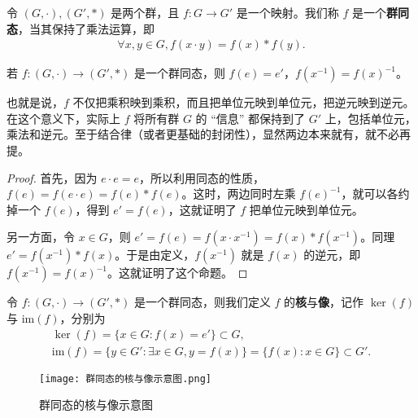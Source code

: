 \documentclass[../../main.tex]{subfiles}
\begin{document}
\begin{definition}[群同态]
令 $(G, \cdot), (G', *)$ 是两个群，且 $f : G \to G'$ 是一个映射。我们称 $f$ 是一个\textbf{群同态}，当其保持了乘法运算，即
\begin{align*}
\forall x, y \in G, f(x \cdot y) = f(x) * f(y).
\end{align*} 
\end{definition}

\begin{proposition}\label{proposition:群同态保持逆元和单位元}
若 $f : (G, \cdot) \to (G', *)$ 是一个群同态，则 $f(e) = e'$，$f(x^{-1}) = f(x)^{-1}$。
\end{proposition}
\begin{note}
也就是说，$f$ 不仅把乘积映到乘积，而且把单位元映到单位元，把逆元映到逆元。在这个意义下，实际上 $f$ 将所有群 $G$ 的 “信息” 都保持到了 $G'$ 上，包括单位元，乘法和逆元。至于结合律（或者更基础的封闭性），显然两边本来就有，就不必再提。
\end{note}
\begin{proof}
首先，因为 $e \cdot e = e$，所以利用同态的性质，$f(e) = f(e \cdot e) = f(e) * f(e)$。这时，两边同时左乘 $f(e)^{-1}$，就可以各约掉一个 $f(e)$，得到 $e' = f(e)$，这就证明了 $f$ 把单位元映到单位元。

另一方面，令 $x \in G$，则 $e' = f(e) = f(x \cdot x^{-1}) = f(x) * f(x^{-1})$。同理 $e' = f(x^{-1}) * f(x)$。于是由定义，$f(x^{-1})$ 就是 $f(x)$ 的逆元，即 $f(x^{-1}) = f(x)^{-1}$。这就证明了这个命题。 

\end{proof}

\begin{definition}[群同态的核与像]
令 $f : (G, \cdot) \to (G', *)$ 是一个群同态，则我们定义 $f$ 的\textbf{核}与\textbf{像}，记作 $\ker(f)$ 与 $\mathrm{im}(f)$，分别为
\begin{gather*}
\ker(f) = \{x \in G : f(x) = e'\} \subset G ,\\
\mathrm{im}(f) = \{y \in G' : \exists x \in G, y = f(x)\} = \{f(x) : x \in G\} \subset G'.
\end{gather*} 
\end{definition}

\begin{figure}[H]
\centering
\texttt{[image: 群同态的核与像示意图.png]}
\label{figure:群同态的核与像示意图}
\caption{群同态的核与像示意图}
\end{figure}
\end{document}
